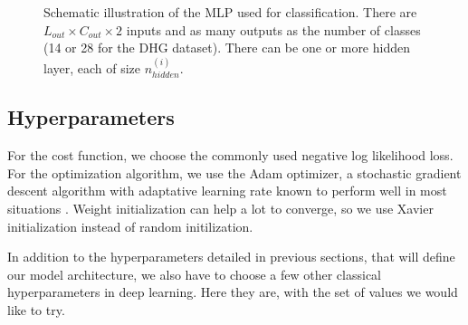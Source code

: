\documentclass{article}
\begin{document}
\begin{figure}
    \centering
    \caption{Schematic illustration of the MLP used for classification. There are $L_{out} \times C_{out} \times 2$ inputs and as many outputs as the number of classes (14 or 28 for the DHG dataset). There can be one or more hidden layer, each of size $n_{hidden}^{(i)}$.}
    \label{fig:mlp-classification-module}
\end{figure}

\subsection{Hyperparameters}
For the cost function, we choose the commonly used negative log likelihood loss. For the optimization algorithm, we use the Adam optimizer, a stochastic gradient descent algorithm with adaptative learning rate \cite{kingma2014adam} known to perform well in most situations \cite{Ruder2016-gradient-descent-algos-overview}. Weight initialization can help a lot to converge, so we use Xavier initialization \cite{xavier-init} instead of random initilization.
\par
In addition to the hyperparameters detailed in previous sections, that will define our model architecture, we also have to choose a few other classical hyperparameters in deep learning. Here they are, with the set of values we would like to try.
\end{document}
